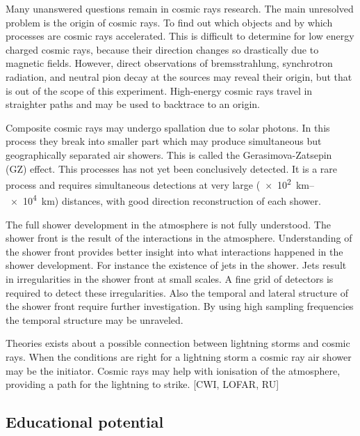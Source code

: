 Many unanswered questions remain in cosmic rays research. The main unresolved problem is the origin of cosmic rays. To find out which objects and by which processes are cosmic rays accelerated. This is difficult to determine for low energy charged cosmic rays, because their direction changes so drastically due to magnetic fields. However, direct observations of bremsstrahlung, synchrotron radiation, and neutral pion decay at the sources may reveal their origin, but that is out of the scope of this experiment. High-energy cosmic rays travel in straighter paths and may be used to backtrace to an origin.

Composite cosmic rays may undergo spallation due to solar photons. In this process they break into smaller part which may produce simultaneous but geographically separated air showers. This is called the Gerasimova-Zatsepin (GZ) effect. This processes has not yet been conclusively detected. It is a rare process and requires simultaneous detections at very large (\SIrange{e2}{e4}{\kilo\meter}) distances, with good direction reconstruction of each shower.

The full shower development in the atmosphere is not fully understood. The shower front is the result of the interactions in the atmosphere. Understanding of the shower front provides better insight into what interactions happened in the shower development. For instance the existence of jets in the shower. Jets result in irregularities in the shower front at small scales. A fine grid of detectors is required to detect these irregularities. Also the temporal and lateral structure of the shower front require further investigation. By using high sampling frequencies the temporal structure may be unraveled.

Theories exists about a possible connection between lightning storms and cosmic rays. When the conditions are right for a lightning storm a cosmic ray air shower may be the initiator. Cosmic rays may help with ionisation of the atmosphere, providing a path for the lightning to strike. [CWI, LOFAR, RU]

\subsection{Educational potential}

